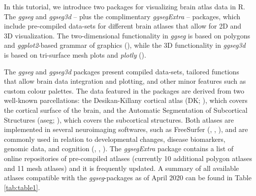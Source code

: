 \documentclass[fleqn,10pt]{wlpeerj} %
\begin{document}
In this tutorial, we introduce two packages for visualizing brain atlas data in R.
The \emph{ggseg} and \emph{ggseg3d} -- plus the complimentary \emph{ggsegExtra} -- packages, which include pre-compiled data-sets for different brain atlases that allow for 2D and 3D visualization.
The two-dimensional functionality in \emph{ggseg} is based on polygons and \emph{ggplot2}-based grammar of graphics (\citet{ggplot}), while the 3D functionality in \emph{ggseg3d} is based on tri-surface mesh plots and \emph{plotly} (\citet{plotly}).

The \emph{ggseg} and \emph{ggseg3d} packages present compiled data-sets, tailored functions that allow brain data integration and plotting, and other minor features such as custom colour palettes.
The data featured in the packages are derived from two well-known parcellations: the Desikan-Killany cortical atlas (DK; \citet{dk}), which covers the cortical surface of the brain, and the Automatic Segmentation of Subcortical Structures (aseg; \citet{aseg}), which covers the subcortical structures.
Both atlases are implemented in several neuroimaging softwares, such as FreeSurfer (\citet{fischl_99}, \citet{dale_99}, \citet{Fischl2000}), and are commonly used in relation to developmental changes, disease biomarkers, genomic data, and cognition (\citet{amlien_elaboration_2019}, \citet{WALHOVD20051261}, \citet{Pizzagalli}).
The \emph{ggsegExtra} package contains a list of online repositories of pre-compiled atlases (currently 10 additional polygon atlases and 11 mesh atlases) and it is frequently updated.
A summary of all available atlases compatible with the \emph{ggseg}-packages as of April 2020 can be found in Table \ref{tab:table1}.
\end{document}
